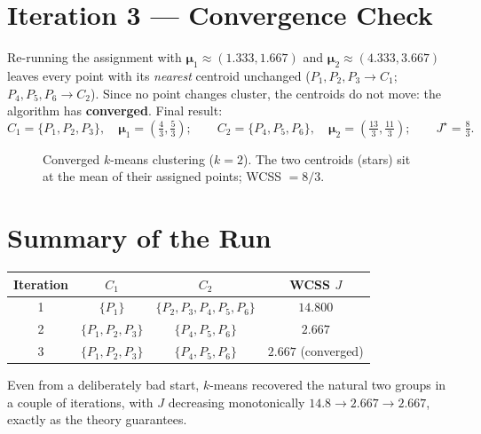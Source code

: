 \documentclass[11pt,a4paper]{report}
\theoremstyle{definition}
\theoremstyle{plain}
\theoremstyle{remark}
\newcommand{\vmu}{\bm{\mu}}
\begin{document}
	\section{Iteration 3 --- Convergence Check}
	Re-running the assignment with $\vmu_1\approx(1.333,1.667)$ and
	$\vmu_2\approx(4.333,3.667)$ leaves every point with its \emph{nearest} centroid
	unchanged ($P_1,P_2,P_3\!\to\!C_1$; $P_4,P_5,P_6\!\to\!C_2$). Since no point
	changes cluster, the centroids do not move: the algorithm has
	\textbf{converged}. Final result:
	\[
	C_1=\{P_1,P_2,P_3\},\quad \vmu_1=(\tfrac43,\tfrac53);\qquad
	C_2=\{P_4,P_5,P_6\},\quad \vmu_2=(\tfrac{13}{3},\tfrac{11}{3});\qquad J^\star=\tfrac83 .
	\]
	
	\begin{figure}[ht]
		\centering
		\caption{Converged $k$-means clustering ($k=2$). The two centroids (stars) sit
			at the mean of their assigned points; WCSS $=8/3$.}
		\label{fig:kmeans}
	\end{figure}
	
	\section{Summary of the Run}
	\begin{center}
		\begin{tabular}{@{}cccc@{}}
			\toprule
			Iteration & $C_1$ & $C_2$ & WCSS $J$\\
			\midrule
			1 & $\{P_1\}$ & $\{P_2,P_3,P_4,P_5,P_6\}$ & $14.800$\\
			2 & $\{P_1,P_2,P_3\}$ & $\{P_4,P_5,P_6\}$ & $2.667$\\
			3 & $\{P_1,P_2,P_3\}$ & $\{P_4,P_5,P_6\}$ & $2.667$ (converged)\\
			\bottomrule
		\end{tabular}
	\end{center}
	Even from a deliberately bad start, $k$-means recovered the natural two groups
	in a couple of iterations, with $J$ decreasing monotonically
	$14.8\to2.667\to2.667$, exactly as the theory guarantees.
	
\end{document}

